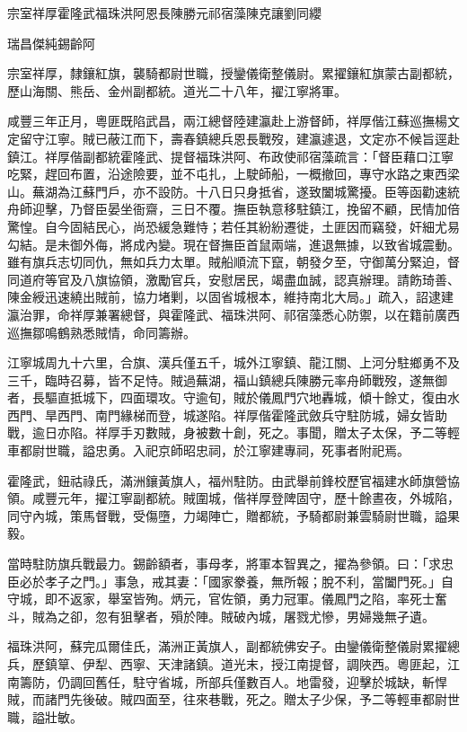 
\begin{pinyinscope}
宗室祥厚霍隆武福珠洪阿恩長陳勝元祁宿藻陳克讓劉同纓

瑞昌傑純錫齡阿

宗室祥厚，隸鑲紅旗，襲騎都尉世職，授鑾儀衛整儀尉。累擢鑲紅旗蒙古副都統，歷山海關、熊岳、金州副都統。道光二十八年，擢江寧將軍。

咸豐三年正月，粵匪既陷武昌，兩江總督陸建瀛赴上游督師，祥厚偕江蘇巡撫楊文定留守江寧。賊已蔽江而下，壽春鎮總兵恩長戰歿，建瀛遽退，文定亦不候旨逕赴鎮江。祥厚偕副都統霍隆武、提督福珠洪阿、布政使祁宿藻疏言：「督臣藉口江寧吃緊，趕回布置，沿途險要，並不屯扎，上駛師船，一概撤回，專守水路之東西梁山。蕪湖為江蘇門戶，亦不設防。十八日只身抵省，遂致闔城驚擾。臣等函勸速統舟師迎擊，乃督臣晏坐衙齋，三日不覆。撫臣執意移駐鎮江，挽留不顧，民情加倍驚惶。自今固結民心，尚恐緩急難恃；若任其紛紛遷徙，土匪因而竊發，奸細尤易勾結。是未御外侮，將成內變。現在督撫臣首鼠兩端，進退無據，以致省城震動。雖有旗兵志切同仇，無如兵力太單。賊船順流下竄，朝發夕至，守御萬分緊迫，督同道府等官及八旗協領，激勵官兵，安慰居民，竭盡血誠，認真辦理。請飭琦善、陳金綬迅速繞出賊前，協力堵剿，以固省城根本，維持南北大局。」疏入，詔逮建瀛治罪，命祥厚兼署總督，與霍隆武、福珠洪阿、祁宿藻悉心防禦，以在籍前廣西巡撫鄒鳴鶴熟悉賊情，命同籌辦。

江寧城周九十六里，合旗、漢兵僅五千，城外江寧鎮、龍江關、上河分駐鄉勇不及三千，臨時召募，皆不足恃。賊過蕪湖，福山鎮總兵陳勝元率舟師戰歿，遂無御者，長驅直抵城下，四面環攻。守逾旬，賊於儀鳳門穴地轟城，傾十餘丈，復由水西門、旱西門、南門緣梯而登，城遂陷。祥厚偕霍隆武斂兵守駐防城，婦女皆助戰，逾日亦陷。祥厚手刃數賊，身被數十創，死之。事聞，贈太子太保，予二等輕車都尉世職，謚忠勇。入祀京師昭忠祠，於江寧建專祠，死事者附祀焉。

霍隆武，鈕祜祿氏，滿洲鑲黃旗人，福州駐防。由武舉前鋒校歷官福建水師旗營協領。咸豐元年，擢江寧副都統。賊圍城，偕祥厚登陴固守，歷十餘晝夜，外城陷，同守內城，策馬督戰，受傷墮，力竭陣亡，贈都統，予騎都尉兼雲騎尉世職，謚果毅。

當時駐防旗兵戰最力。錫齡額者，事母孝，將軍本智異之，擢為參領。曰：「求忠臣必於孝子之門。」事急，戒其妻：「國家豢養，無所報；脫不利，當闔門死。」自守城，即不返家，舉室皆殉。炳元，官佐領，勇力冠軍。儀鳳門之陷，率死士奮斗，賊為之卻，忽有狙擊者，殞於陣。賊破內城，屠戮尤慘，男婦幾無孑遺。

福珠洪阿，蘇完瓜爾佳氏，滿洲正黃旗人，副都統佛安子。由鑾儀衛整儀尉累擢總兵，歷鎮筸、伊犁、西寧、天津諸鎮。道光末，授江南提督，調陜西。粵匪起，江南籌防，仍調回舊任，駐守省城，所部兵僅數百人。地雷發，迎擊於城缺，斬悍賊，而諸門先後破。賊四面至，往來巷戰，死之。贈太子少保，予二等輕車都尉世職，謚壯敏。


\end{pinyinscope}
